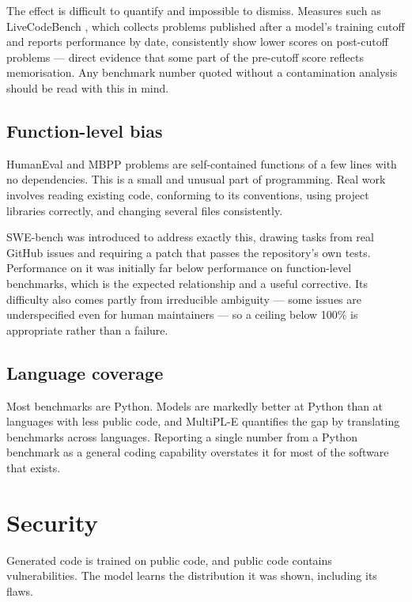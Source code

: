 \documentclass[11pt,a4paper]{article}
\begin{document}
The effect is difficult to quantify and impossible to dismiss. Measures such
as LiveCodeBench \cite{jain2024}, which collects problems published after a
model's training cutoff and reports performance by date, consistently show
lower scores on post-cutoff problems --- direct evidence that some part of the
pre-cutoff score reflects memorisation. Any benchmark number quoted without a
contamination analysis should be read with this in mind.

\subsection{Function-level bias}

HumanEval and MBPP problems are self-contained functions of a few lines with
no dependencies. This is a small and unusual part of programming. Real work
involves reading existing code, conforming to its conventions, using project
libraries correctly, and changing several files consistently.

SWE-bench \cite{jimenez2024} was introduced to address exactly this, drawing
tasks from real GitHub issues and requiring a patch that passes the
repository's own tests. Performance on it was initially far below performance
on function-level benchmarks, which is the expected relationship and a useful
corrective. Its difficulty also comes partly from irreducible ambiguity ---
some issues are underspecified even for human maintainers --- so a ceiling
below 100\% is appropriate rather than a failure.

\subsection{Language coverage}

Most benchmarks are Python. Models are markedly better at Python than at
languages with less public code, and MultiPL-E \cite{cassano2023} quantifies
the gap by translating benchmarks across languages. Reporting a single number
from a Python benchmark as a general coding capability overstates it for most
of the software that exists.

\section{Security}
\label{sec:security}

Generated code is trained on public code, and public code contains
vulnerabilities. The model learns the distribution it was shown, including its
flaws.
\end{document}
